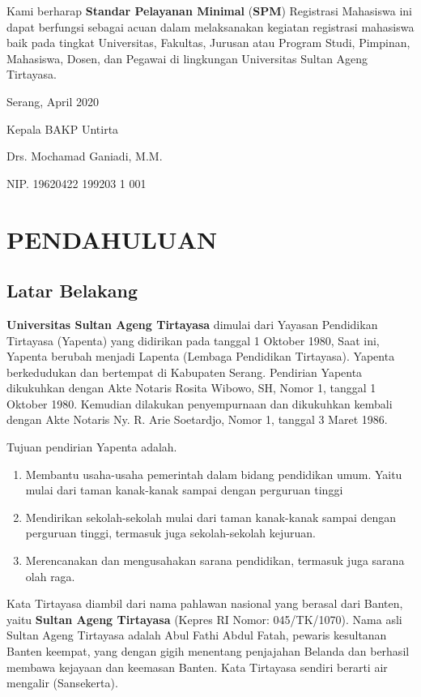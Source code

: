 \documentclass[
]{book}
\providecommand{\tightlist}{%
  \setlength{\itemsep}{0pt}\setlength{\parskip}{0pt}}
\begin{document}
Kami berharap \textbf{Standar Pelayanan Minimal} (\textbf{SPM}) Registrasi Mahasiswa ini dapat berfungsi sebagai acuan dalam melaksanakan kegiatan registrasi mahasiswa baik pada tingkat Universitas, Fakultas, Jurusan atau Program Studi, Pimpinan, Mahasiswa, Dosen, dan Pegawai di lingkungan Universitas Sultan Ageng Tirtayasa.

Serang, April 2020

Kepala BAKP Untirta

Drs. Mochamad Ganiadi, M.M.

NIP. 19620422 199203 1 001

\hypertarget{intro}{%
\chapter{PENDAHULUAN}\label{intro}}

\hypertarget{latar-belakang}{%
\section{Latar Belakang}\label{latar-belakang}}

\textbf{Universitas Sultan Ageng Tirtayasa} dimulai dari Yayasan Pendidikan Tirtayasa (Yapenta) yang didirikan pada tanggal 1 Oktober 1980, Saat ini, Yapenta berubah menjadi Lapenta (Lembaga Pendidikan Tirtayasa). Yapenta berkedudukan dan bertempat di Kabupaten Serang. Pendirian Yapenta dikukuhkan dengan Akte Notaris Rosita Wibowo, SH, Nomor 1, tanggal 1 Oktober 1980. Kemudian dilakukan penyempurnaan dan dikukuhkan kembali dengan Akte Notaris Ny. R. Arie Soetardjo, Nomor 1, tanggal 3 Maret 1986.

Tujuan pendirian Yapenta adalah.

\begin{enumerate}
\def\labelenumi{\arabic{enumi}.}
\tightlist
\item
  Membantu usaha-usaha pemerintah dalam bidang pendidikan umum. Yaitu mulai dari taman kanak-kanak sampai dengan perguruan tinggi
\item
  Mendirikan sekolah-sekolah mulai dari taman kanak-kanak sampai dengan perguruan tinggi, termasuk juga sekolah-sekolah kejuruan.
\item
  Merencanakan dan mengusahakan sarana pendidikan, termasuk juga sarana olah raga.
\end{enumerate}

Kata Tirtayasa diambil dari nama pahlawan nasional yang berasal dari Banten, yaitu \textbf{Sultan Ageng Tirtayasa} (Kepres RI Nomor: 045/TK/1070). Nama asli Sultan Ageng Tirtayasa adalah Abul Fathi Abdul Fatah, pewaris kesultanan Banten keempat, yang dengan gigih menentang penjajahan Belanda dan berhasil membawa kejayaan dan keemasan Banten. Kata Tirtayasa sendiri berarti air mengalir (Sansekerta).
\end{document}
